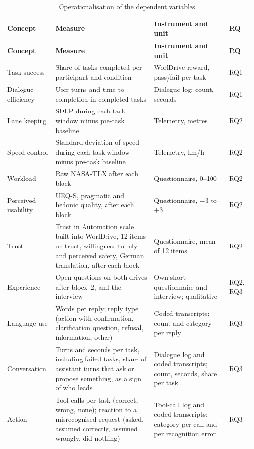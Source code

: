 \documentclass[
    a4paper,
    11pt,
    DIV=11,
    bigheadings,
    idxtotoc,
    listof=totoc,
    bibtotoc,
    halfparskip,
    cleardoubleempty,
    openright,
    oneside
]{scrartcl}
\begin{document}
{\small
\begin{longtable}{>{\raggedright\arraybackslash}p{2.6cm} >{\raggedright\arraybackslash}p{6.2cm} >{\raggedright\arraybackslash}p{4.4cm} >{\raggedright\arraybackslash}p{0.9cm}}
    \caption{Operationalisation of the dependent variables}\label{tab:dv}\\
    \toprule
    \textbf{Concept} & \textbf{Measure} & \textbf{Instrument and unit} & \textbf{RQ} \\
    \midrule
    \endfirsthead
    \toprule
    \textbf{Concept} & \textbf{Measure} & \textbf{Instrument and unit} & \textbf{RQ} \\
    \midrule
    \endhead
    Task success & Share of tasks completed per participant and condition & WorlDrive reward, pass/fail per task & RQ1 \\
    Dialogue efficiency & User turns and time to completion in completed tasks & Dialogue log; count, seconds & RQ1 \\
    Lane keeping & SDLP during each task window minus pre-task baseline & Telemetry, metres & RQ2 \\
    Speed control & Standard deviation of speed during each task window minus pre-task baseline & Telemetry, km/h & RQ2 \\
    Workload & Raw NASA-TLX after each block \cite{Hart88NASA} & Questionnaire, 0--100 & RQ2 \\
    Perceived usability & UEQ-S, pragmatic and hedonic quality, after each block \cite{Schrepp17UEQS} & Questionnaire, $-3$ to $+3$ & RQ2 \\
    Trust & Trust in Automation scale built into WorlDrive, 12 items on trust, willingness to rely and perceived safety, German translation, after each block & Questionnaire, mean of 12 items & RQ2 \\
    Experience & Open questions on both drives after block~2, and the interview & Own short questionnaire and interview; qualitative & RQ2, RQ3 \\
    Language use & Words per reply; reply type (action with confirmation, clarification question, refusal, information, other) & Coded transcripts; count and category per reply & RQ3 \\
    Conversation & Turns and seconds per task, including failed tasks; share of assistant turns that ask or propose something, as a sign of who leads & Dialogue log and coded transcripts; count, seconds, share per task & RQ3 \\
    Action & Tool calls per task (correct, wrong, none); reaction to a misrecognised request (asked, assumed correctly, assumed wrongly, did nothing) & Tool-call log and coded transcripts; category per call and per recognition error & RQ3 \\
    \bottomrule
\end{longtable}
}
\end{document}
